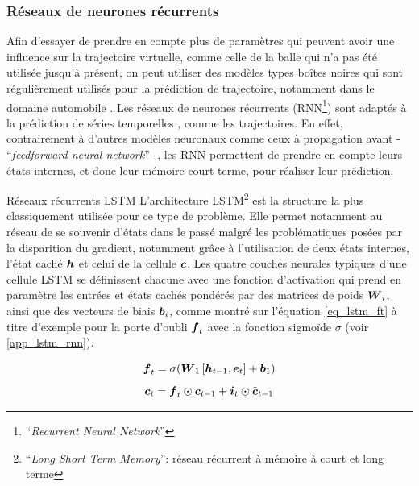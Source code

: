 

\subsubsection{Réseaux de neurones récurrents} \label{chap3_sec_method_sub_virt_traj_5}

Afin d'essayer de prendre en compte plus de paramètres qui peuvent avoir une influence sur la trajectoire virtuelle, comme celle de la balle qui n'a pas été utilisée jusqu'à présent, on peut utiliser des modèles types boîtes noires qui sont régulièrement utilisés pour la prédiction de trajectoire, notamment dans le domaine automobile \parencite{altche_lstm_2018,mercat_multi-head_2019}. Les réseaux de neurones récurrents (RNN\footnote{\foreignquote{french}{\textit{Recurrent Neural Network}}}) sont adaptés à la prédiction de séries temporelles \parencite{yu_review_2019}, comme les trajectoires. En effet, contrairement à d'autres modèles neuronaux comme ceux à propagation avant - \foreignquote{french}{\textit{feedforward neural network}} -, les RNN permettent de prendre en compte leurs états internes, et donc leur mémoire court terme, pour réaliser leur prédiction. 

\begin{aside}{Réseaux récurrents LSTM}
	L'architecture LSTM\footnote{\foreignquote{french}{\textit{Long Short Term Memory}}: réseau récurrent à mémoire à court et long terme} \parencite{hochreiter_long_1997} est la structure la plus classiquement utilisée pour ce type de problème. Elle permet notamment au réseau de se souvenir d'états dans le passé malgré les problématiques posées par la disparition du gradient, notamment grâce à l'utilisation de deux états internes, l'état caché $\vect{h}$ et celui de la cellule $\vect{c}$. Les quatre couches neurales typiques d'une cellule LSTM se définissent chacune avec une fonction d'activation qui prend en paramètre les entrées et états cachés pondérés par des matrices de poids $\matr{W}_i$, ainsi que des vecteurs de biais $\vect{b}_i$, comme montré sur l'équation \cref{eq_lstm_ft} à titre d'exemple pour la porte d'oubli $\vect{f}_t$ avec la fonction sigmoïde $\sigma$ (voir \cref{app_lstm_rnn}).
	
	\begin{equation} \label{eq_lstm_ft}
	\vect{f}_t = \sigma(\matr{W}_1 \left[\vect{h}_{t-1}, \vect{e}_t\right] + \vect{b}_1)
	\end{equation}
	\begin{equation} \label{eq_lstm_ct}
	\vect{c}_t = \vect{f}_t \hadamard \vect{c}_{t-1} + \vect{i}_t \hadamard \tilde{\vect{c}}_{t-1} 
	\end{equation}
	
	
	
\end{aside}

